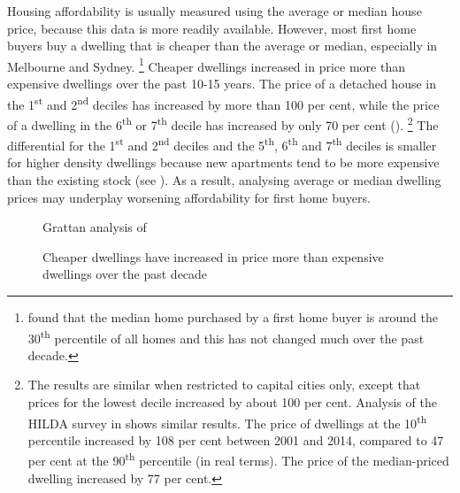 Housing affordability is usually measured using the average or median house price, because this data is more readily available.
However, most first home buyers buy a dwelling that is cheaper than the average or median, especially in Melbourne and Sydney.%
	\footnote{\textcite[][16]{Simon-Stone-2017-Property-Ladder} found that the median home purchased by a first home buyer is around the 30\textsuperscript{th} percentile of all homes and this has not changed much over the past decade.}
Cheaper dwellings increased in price more than expensive dwellings over the past 10-15 years.
The price of a detached house in the 1\textsuperscript{st} and  2\textsuperscript{nd} deciles has increased by more than 100 per cent, while the price of a dwelling in the 6\textsuperscript{th} or 7\textsuperscript{th} decile has increased by only 70 per cent ().%
	\footnote{The results are similar when restricted to capital cities only, except that prices for the lowest decile increased by about 100 per cent. Analysis of the HILDA survey in  \textcite{Wilkins2016HouseholdIncomeLabour} shows similar results.
	The price of dwellings at the 10\textsuperscript{th} percentile increased by 108 per cent between 2001 and 2014, compared to 47 per cent at the 90\textsuperscript{th} percentile (in real terms).
	The price of the median-priced dwelling increased by 77 per cent.}
The differential for the 1\textsuperscript{st} and 2\textsuperscript{nd} deciles and the 5\textsuperscript{th}, 6\textsuperscript{th} and 7\textsuperscript{th} deciles is smaller for higher density dwellings because new apartments tend to be more expensive than the existing stock (see ).
As a result, analysing average or median dwelling prices may underplay worsening affordability for first home buyers.


\begin{figure}
\caption{Cheaper dwellings have increased in price more than expensive dwellings over the past decade}\label{fig:house-price-deciles}
%
{Grattan analysis of \textcites{ABS-HES-201516-Microdata}{ABS-HES-200304-Microdata}}
\end{figure}

